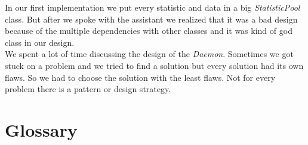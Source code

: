 \documentclass[i2]{oss}
\newcommand{\class}[1]{\emph{#1}}
\begin{document}
In our first implementation we put every statistic and data in a big \class{StatisticPool} class. But after we spoke with the assistant we realized that it was a bad design because of the multiple dependencies with other classes and it was kind of god class in our design. \\

We spent a lot of time discussing the design of the \class{Daemon}. Sometimes we got stuck on a problem and we tried to find a solution but every solution had its own flaws. So we had to choose the solution with the least flaws. Not for every problem there is a pattern or design strategy. 
\\








\section{Glossary}
\label{ssec:glossary}
\end{document}
